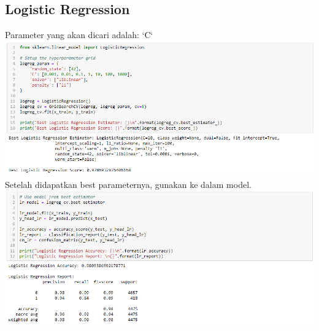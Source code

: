 \documentclass[12pt]{article}
\begin{document}
    \subsection{Logistic Regression}
    \newline
    \newline Parameter yang akan dicari adalah: `C`
    \newline \includegraphics[scale=0.535]{logreg-tune.png}
    \newline
    \newline Setelah didapatkan best parameternya, gunakan ke dalam model.
    \newline \includegraphics[scale=0.535]{logreg-model.png}
    
    \newpage
    
\end{document}

